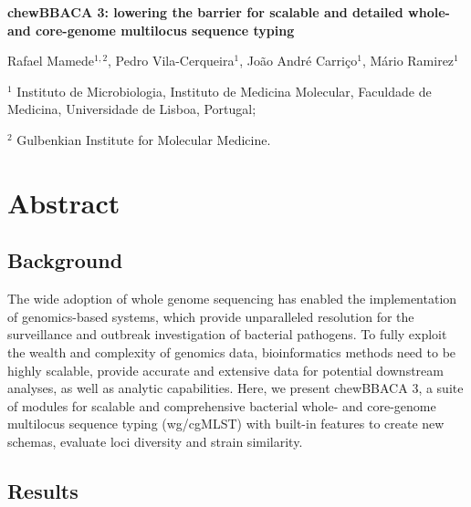 \cleardoublepage 

\begin{center}
\large
\textbf{chewBBACA 3: lowering the barrier for scalable and detailed whole- and core-genome multilocus sequence typing}
\end{center}

Rafael Mamede$^{1,2}$, 
Pedro Vila-Cerqueira$^{1}$,
João André Carriço$^{1}$,
Mário Ramirez$^{1}$

$^1$ Instituto de Microbiologia, Instituto de Medicina Molecular, Faculdade de Medicina, Universidade de Lisboa, Portugal;

$^2$ Gulbenkian Institute for Molecular Medicine.

\section{Abstract} \label{sec:ch2_abstract}

\subsection{Background} \label{ssec:ch2_abstract}

The wide adoption of whole genome sequencing has enabled the implementation of genomics-based systems, which provide unparalleled resolution for the surveillance and outbreak investigation of bacterial pathogens. To fully exploit the wealth and complexity of genomics data, bioinformatics methods need to be highly scalable, provide accurate and extensive data for potential downstream analyses, as well as analytic capabilities. Here, we present chewBBACA 3, a suite of modules for scalable and comprehensive bacterial whole- and core-genome multilocus sequence typing (wg/cgMLST) with built-in features to create new schemas, evaluate loci diversity and strain similarity.

\subsection{Results} \label{ssec:ch2_abstract}

